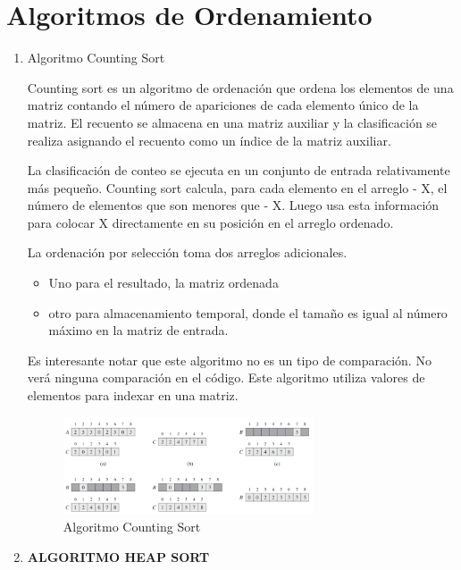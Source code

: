 \documentclass{article}
\begin{document}
	\section{Algoritmos de Ordenamiento}\label{sec:ejercicios}
	\begin{enumerate}
		\item Algoritmo Counting Sort
		
			Counting sort es un algoritmo de ordenación que ordena los elementos de una matriz contando el número de apariciones de cada elemento único de la matriz. El recuento se almacena en una matriz auxiliar y la clasificación se realiza asignando el recuento como un índice de la matriz auxiliar.
			
La clasificación de conteo se ejecuta en un conjunto de entrada relativamente más pequeño. Counting sort calcula, para cada elemento en el arreglo - X, el número de elementos que son menores que - X. Luego usa esta información para colocar X directamente en su posición en el arreglo ordenado.

La ordenación por selección toma dos arreglos adicionales.

\begin{itemize}
   \item Uno para el resultado, la matriz ordenada
   \item otro para almacenamiento temporal, donde el tamaño es   igual al número máximo en la matriz de entrada.
 \end{itemize}	
 
 Es interesante notar que este algoritmo no es un tipo de comparación. No verá ninguna comparación en el código. Este algoritmo utiliza valores de elementos para indexar en una matriz.
		
\begin{figure}[H]
\centering
\includegraphics[width=0.7\textwidth]{img/CountS}
\caption{Algoritmo Counting Sort}
\label{fig:CountS}
\end{figure}


		
\item \textbf{ALGORITMO HEAP SORT}


\end{enumerate}
\end{document}
